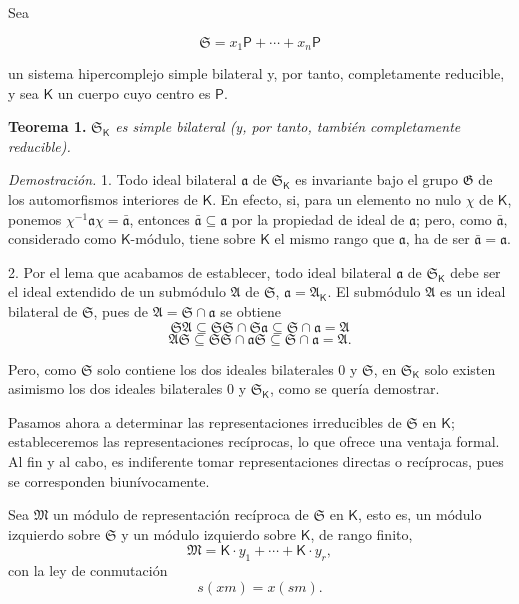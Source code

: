 Sea

\[
\mathfrak S=x_1\mathsf P+\cdots+x_n\mathsf P
\]

un sistema hipercomplejo simple bilateral y, por tanto, completamente reducible, y sea \(\mathsf K\) un cuerpo cuyo centro es \(\mathsf P\).

\textbf{Teorema 1.} \emph{\(\mathfrak S_{\mathsf K}\) es simple bilateral (y, por tanto, también completamente reducible).}

\emph{Demostración.} 1. Todo ideal bilateral \(\mathfrak a\) de \(\mathfrak S_{\mathsf K}\) es invariante bajo el grupo \(\mathfrak G\) de los automorfismos interiores de \(\mathsf K\). En efecto, si, para un elemento no nulo \(\chi\) de \(\mathsf K\), ponemos \(\chi^{-1}\mathfrak a\chi=\bar{\mathfrak a}\), entonces \(\bar{\mathfrak a}\subseteq\mathfrak a\) por la propiedad de ideal de \(\mathfrak a\); pero, como \(\bar{\mathfrak a}\), considerado como \(\mathsf K\)-módulo, tiene sobre \(\mathsf K\) el mismo rango que \(\mathfrak a\), ha de ser \(\bar{\mathfrak a}=\mathfrak a\).

2. Por el lema que acabamos de establecer, todo ideal bilateral \(\mathfrak a\) de \(\mathfrak S_{\mathsf K}\) debe ser el ideal extendido de un submódulo \(\mathfrak A\) de \(\mathfrak S\), \(\mathfrak a=\mathfrak A_{\mathsf K}\). El submódulo \(\mathfrak A\) es un ideal bilateral de \(\mathfrak S\), pues de \(\mathfrak A=\mathfrak S\cap\mathfrak a\) se obtiene
\[
\mathfrak S\mathfrak A\subseteq\mathfrak S\mathfrak S\cap\mathfrak S\mathfrak a\subseteq\mathfrak S\cap\mathfrak a=\mathfrak A
\]
\[
\mathfrak A\mathfrak S\subseteq\mathfrak S\mathfrak S\cap\mathfrak a\mathfrak S\subseteq\mathfrak S\cap\mathfrak a=\mathfrak A.
\]

Pero, como \(\mathfrak S\) solo contiene los dos ideales bilaterales \(0\) y \(\mathfrak S\), en \(\mathfrak S_{\mathsf K}\) solo existen asimismo los dos ideales bilaterales \(0\) y \(\mathfrak S_{\mathsf K}\), como se quería demostrar.

Pasamos ahora a determinar las representaciones irreducibles de \(\mathfrak S\) en \(\mathsf K\); estableceremos las representaciones recíprocas, lo que ofrece una ventaja formal. Al fin y al cabo, es indiferente tomar representaciones directas o recíprocas, pues se corresponden biunívocamente.

Sea \(\mathfrak M\) un módulo de representación recíproca de \(\mathfrak S\) en \(\mathsf K\), esto es, un módulo izquierdo sobre \(\mathfrak S\) y un módulo izquierdo sobre \(\mathsf K\), de rango finito,
\[
\mathfrak M=\mathsf K\cdot y_1+\cdots+\mathsf K\cdot y_r,
\]
con la ley de conmutación
\[
s(xm)=x(sm).
\]

